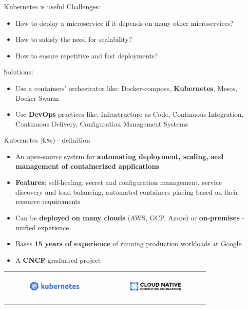 \documentclass{beamer}
\begin{document}
\begin{frame}{Kubernetes is useful}%
Challenges:
\begin{itemize}
	\item How to deploy a microservice if it depends on many other microservices?
	\item How to satisfy the need for scalability?
	\item How to ensure repetitive and fast deployments?
\end{itemize}

Solutions:
\begin{itemize}
	\item Use a containers' orchestrator like: Docker-compose, \textbf{Kubernetes}, Mesos, Docker Swarm
	\item Use \textbf{DevOps} practices like: Infrastructure as Code, Continuous Integration, Continuous Delivery, Configuration Management Systems
\end{itemize}
\end{frame}

\begin{frame}{Kubernetes (k8s) - definition}%
\begin{itemize}
\item An open-source system for \textbf{automating deployment, scaling, and management of containerized applications}
\item \textbf{Features}: self-healing, secret and configuration management, service discovery and load balancing, automated containers placing based on their resource requirements
\item Can be \textbf{deployed on many clouds} (AWS, GCP, Azure) or \textbf{on-premises} - unified experience
\item Bases \textbf{15 years of experience} of running production workloads at Google
\item A \textbf{CNCF} graduated project
\end{itemize}

\begin{tabular}{  c c }
	\begin{figure}
		\includegraphics[width=3cm]{figures/kubernetes-logo.png}
		\label{fig:kubernetes-logo}
	\end{figure} &
	\begin{figure}
		\includegraphics[width=3cm]{figures/cncf-logo.png}
		\label{fig:cncf-logo}
	\end{figure} 
\end{tabular}
\end{frame}
\end{document}
